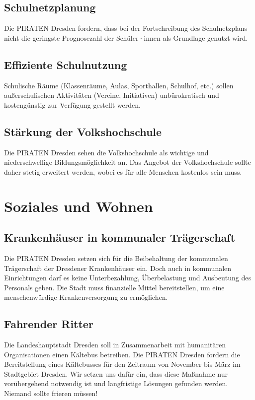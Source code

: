 \documentclass[a4paper, 11pt]{article}
\begin{document}
\subsection{Schulnetzplanung}
Die PIRATEN Dresden fordern, dass bei der Fortschreibung des Schulnetzplans nicht die geringste Prognosezahl der Schüler·innen als Grundlage genutzt wird.



\subsection{Effiziente Schulnutzung}
Schulische Räume (Klassenräume, Aulas, Sporthallen, Schulhof, etc.) sollen außerschulischen Aktivitäten (Vereine, Initiativen) unbürokratisch und kostengünstig zur Verfügung gestellt werden.


\subsection{Stärkung der Volkshochschule}
Die PIRATEN Dresden sehen die Volkshochschule als wichtige und niederschwellige Bildungsmöglichkeit an. Das Angebot der Volkshochschule sollte daher stetig erweitert werden, wobei es für alle Menschen kostenlos sein muss.


\section{Soziales und Wohnen}

\subsection{Krankenhäuser in kommunaler Trägerschaft}
Die PIRATEN Dresden setzen sich für die Beibehaltung der kommunalen Trägerschaft der Dresdener Krankenhäuser ein. Doch auch in kommunalen Einrichtungen darf es keine Unterbezahlung, Überbelastung und Ausbeutung des Personals geben. Die Stadt muss finanzielle Mittel bereitstellen, um eine menschenwürdige Krankenversorgung zu ermöglichen.


\subsection{Fahrender Ritter}
Die Landeshauptstadt Dresden soll in Zusammenarbeit mit humanitären Organisationen einen Kältebus betreiben. Die PIRATEN Dresden fordern die Bereitstellung eines Kältebusses für den Zeitraum von November bis März im Stadtgebiet Dresden. Wir setzen uns dafür ein, dass diese Maßnahme nur vorübergehend notwendig ist und langfristige Lösungen gefunden werden. Niemand sollte frieren müssen!
\end{document}
